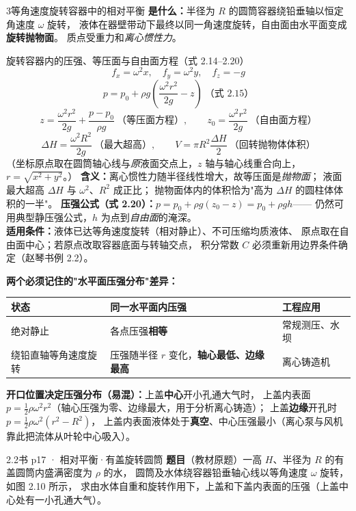 \begin{kaodian}{3}{等角速度旋转容器中的相对平衡}
\textbf{是什么：}半径为 $R$ 的圆筒容器绕铅垂轴以恒定角速度 $\omega$ 旋转，
液体在器壁带动下最终以同一角速度旋转，自由面由水平面变成\textbf{旋转抛物面}。
质点受重力和\emph{离心惯性力}。

\begin{gongshi}{旋转容器内的压强、等压面与自由面方程（式 2.14--2.20）}
\[
f_x=\omega^2x,\quad f_y=\omega^2y,\quad f_z=-g
\]
\[ p=p_0+\rho g\left(\frac{\omega^2r^2}{2g}-z\right)\ \text{（式 2.15）} \]
\[
z=\frac{\omega^2r^2}{2g}+\frac{p-p_0}{\rho g}\ \text{（等压面方程）},\qquad
z_0=\frac{\omega^2r^2}{2g}\ \text{（自由面方程）}
\]
\[
\Delta H=\frac{\omega^2R^2}{2g}\ \text{（最大超高）},\qquad
V=\pi R^2\frac{\Delta H}{2}\ \text{（回转抛物体体积）}
\]
（坐标原点取在圆筒轴心线与\emph{原}液面交点上，$z$ 轴与轴心线重合向上，$r=\sqrt{x^2+y^2}$。）
\textbf{含义：}离心惯性力随半径线性增大，故等压面是\emph{抛物面}；
液面最大超高 $\Delta H$ 与 $\omega^2$、$R^2$ 成正比；
抛物面体内的体积恰为"高为 $\Delta H$ 的圆柱体体积的一半"。
\textbf{压强公式（式 2.20）：}$p=p_0+\rho g(z_0-z)=p_0+\rho g h$——
仍然可用典型静压强公式，$h$ 为点到\emph{自由面}的淹深。\\
\textbf{适用条件：}液体已达等角速度旋转（相对静止）、不可压缩均质液体、
原点取在自由面中心；若原点改取容器底面与转轴交点，
积分常数 $C$ 必须重新用边界条件确定（赵琴书例 2.2）。
\end{gongshi}

\textbf{两个必须记住的"水平面压强分布"差异：}
\begin{center}
\begin{tabularx}{\textwidth}{@{}lXX@{}}
\toprule
状态 & 同一水平面内压强 & 工程应用 \\
\midrule
绝对静止 & 各点压强\textbf{相等} & 常规测压、水坝 \\
绕铅直轴等角速度旋转 & 压强随半径 $r$ 变化，\textbf{轴心最低、边缘最高} & 离心铸造机 \\
\bottomrule
\end{tabularx}
\end{center}

\textbf{开口位置决定压强分布（易混）：}上盖\textbf{中心}开小孔通大气时，
上盖内表面 $p=\frac{1}{2}\rho\omega^2r^2$（轴心压强为零、边缘最大，用于分析离心铸造）；
上盖\textbf{边缘}开孔时 $p=\frac{1}{2}\rho\omega^2(r^2-R^2)$，
上盖内表面液体处于\textbf{真空}、中心压强最小（离心泵与风机靠此把流体从叶轮中心吸入）。

\begin{liti}{2.2}{书 p17 · 相对平衡·有盖旋转圆筒}
\textbf{题目}（教材原题）一高 $H$、半径为 $R$ 的有盖圆筒内盛满密度为 $\rho$ 的水，
圆筒及水体绕容器铅垂轴心线以等角速度 $\omega$ 旋转，如图 2.10 所示，
求由水体自重和旋转作用下，上盖和下盖内表面的压强（上盖中心处有一小孔通大气）。


\end{liti}
\end{kaodian}
